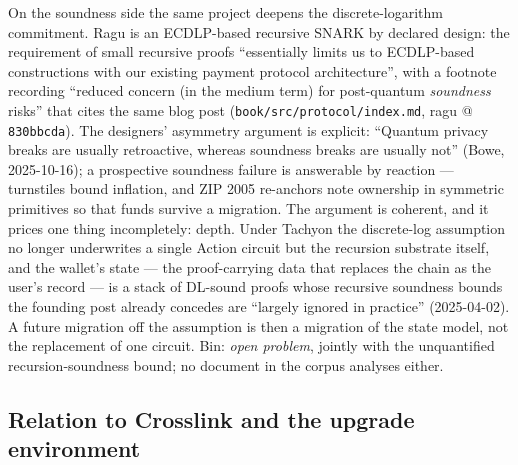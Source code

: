 \documentclass[11pt,a4paper]{article}
\theoremstyle{definition}
\begin{document}
On the soundness side the same project deepens the discrete-logarithm
commitment. Ragu is an ECDLP-based recursive SNARK by declared design: the
requirement of small recursive proofs ``essentially limits us to
ECDLP-based constructions with our existing payment protocol
architecture'', with a footnote recording ``reduced concern (in the medium
term) for post-quantum \emph{soundness} risks'' that cites the same blog
post (\texttt{book/src/protocol/index.md}, ragu @ \texttt{830bbcda}). The
designers' asymmetry argument is explicit: ``Quantum privacy breaks are
usually retroactive, whereas soundness breaks are usually not'' (Bowe,
2025-10-16); a prospective soundness failure is answerable by reaction ---
turnstiles bound inflation, and ZIP 2005 re-anchors note ownership in
symmetric primitives so that funds survive a migration. The argument is
coherent, and it prices one thing incompletely: depth. Under Tachyon the
discrete-log assumption no longer underwrites a single Action circuit but
the recursion substrate itself, and the wallet's state --- the
proof-carrying data that replaces the chain as the user's record --- is a
stack of DL-sound proofs whose recursive soundness bounds the founding post
already concedes are ``largely ignored in practice'' (2025-04-02). A future
migration off the assumption is then a migration of the state model, not
the replacement of one circuit. Bin: \emph{open problem}, jointly with the
unquantified recursion-soundness bound; no document in the corpus analyses
either.

\subsection{Relation to Crosslink and the upgrade environment}
\label{sec:tachyon-environment}
\end{document}
